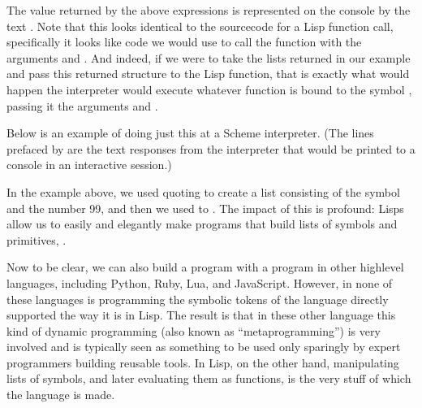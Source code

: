 \documentclass[letterpaper,10pt,english]{sphinxmanual}
\begin{document}
\sphinxAtStartPar
The value returned by the above expressions is represented on the console by the text .
Note that this looks identical to the source\sphinxhyphen{}code for a Lisp function call,
specifically it looks like code we would use to call the function  with the arguments  and .
And indeed, if we were to take the lists returned in our example and pass this returned  structure
to the Lisp  function,
that is exactly what would happen \sphinxhyphen{} the interpreter would execute whatever function is bound to the symbol , passing
it the arguments  and .

\sphinxAtStartPar
Below is an example of doing just this at a Scheme interpreter. (The lines prefaced by \sphinxstylestrong{\textgreater{}} are the text
responses from the interpreter that would be printed to a console in an interactive session.)

\begin{sphinxVerbatim}[commandchars=\\\{\}]
\end{sphinxVerbatim}

\sphinxAtStartPar
In the example above, we used quoting to create
a list consisting of the symbol  and the number 99, and then
we used  to .
The impact of this is profound:
Lisps allow us to easily and elegantly make programs that build lists of symbols and primitives,
.

\sphinxAtStartPar
Now to be clear, we can also build a program with a program in other high\sphinxhyphen{}level languages, including Python, Ruby, Lua, and JavaScript.
However, in none of these languages is programming  the symbolic tokens of the language directly supported the way it is in Lisp.
The result is that in these other language this kind of dynamic programming (also known as “meta\sphinxhyphen{}programming”) is very involved and
is typically seen as something to be used only sparingly by expert programmers building reusable tools.
In Lisp, on the other hand, manipulating lists of symbols, and later evaluating them as functions, is the very stuff of which the language is made.
\end{document}
